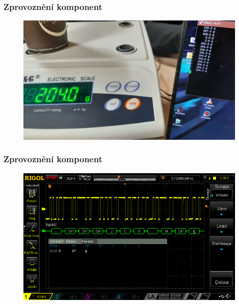 \documentclass[%
  12pt,       				%
	t,                  %
	aspectratio=1610,   %
	unicode,						%
]{beamer}				    	%
\begin{document}
\begin{frame}[c] 
    \frametitle{Zprovoznění komponent}

    \begin{figure}%
				\centering
                \includegraphics[width=0.7\columnwidth]{obrazky/Testování komunikace pomocí PuTTY.jpg}
			\end{figure}
    
\end{frame}

\begin{frame}[c] 
    \frametitle{Zprovoznění komponent}

    \begin{figure}%
				\centering
                \includegraphics[width=0.8\columnwidth]{obrazky/DS1Z_QuickPrint6.png}
			\end{figure}
    
\end{frame}
\end{document}

